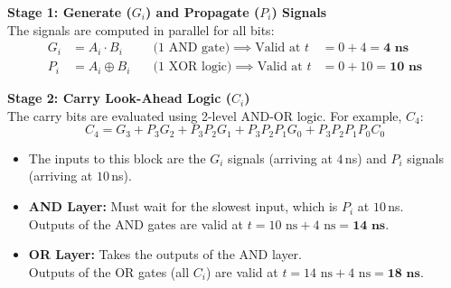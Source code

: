 \documentclass[12pt,a3paper]{article}
\begin{document}
\begin{enumerate}
\begin{tcolorbox}[enhanced,breakable,ansbox,colback=cD!4,colframe=cD,boxrule=0.8pt,arc=5pt,title={\textbf{Answer}},fonttitle=\bfseries\color{white},colbacktitle=cD]
\textbf{Stage 1: Generate ($G_i$) and Propagate ($P_i$) Signals} \\
The signals are computed in parallel for all bits:
\begin{align*}
    G_i &= A_i \cdot B_i \quad &\text{(1 AND gate)} \implies \text{Valid at } t &= 0 + 4 = \mathbf{4\text{ ns}} \\
    P_i &= A_i \oplus B_i \quad &\text{(1 XOR logic)} \implies \text{Valid at } t &= 0 + 10 = \mathbf{10\text{ ns}}
\end{align*}

\textbf{Stage 2: Carry Look-Ahead Logic ($C_i$)} \\
The carry bits are evaluated using 2-level AND-OR logic. For example, $C_4$:
\[
    C_4 = G_3 + P_3G_2 + P_3P_2G_1 + P_3P_2P_1G_0 + P_3P_2P_1P_0C_0
\]
\begin{itemize}
    \item The inputs to this block are the $G_i$ signals (arriving at $4\,$ns) and $P_i$ signals (arriving at $10\,$ns).
    \item \textbf{AND Layer:} Must wait for the slowest input, which is $P_i$ at $10\,$ns. \\
          Outputs of the AND gates are valid at $t = 10\text{ ns} + 4\text{ ns} = \mathbf{14\text{ ns}}$.
    \item \textbf{OR Layer:} Takes the outputs of the AND layer. \\
          Outputs of the OR gates (all $C_i$) are valid at $t = 14\text{ ns} + 4\text{ ns} = \mathbf{18\text{ ns}}$.
\end{itemize}


\end{tcolorbox}
\end{enumerate}
\end{document}
